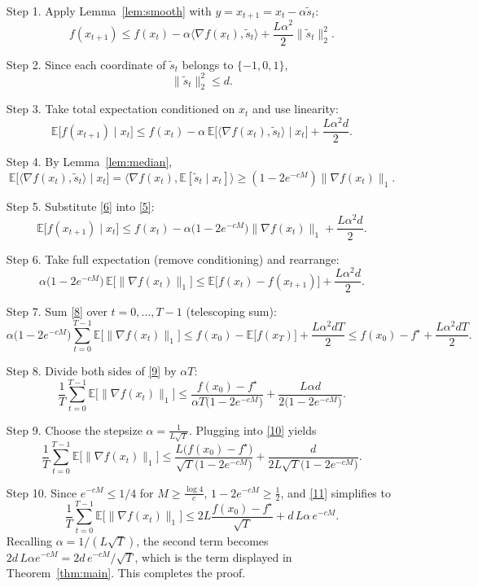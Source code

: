 \documentclass{article}
\newcommand{\E}{\mathbb{E}}
\begin{document}
\begin{enumerate}
\item[Step 1.] Apply Lemma~\ref{lem:smooth} with $y=x_{t+1}=x_{t}-\alpha\tilde{s}_{t}$:
\[
f(x_{t+1})\le f(x_{t})-\alpha\langle\nabla f(x_{t}),\tilde{s}_{t}\rangle
               +\frac{L\alpha^{2}}{2}\|\tilde{s}_{t}\|_{2}^{2}.
\tag{3}
\]
\item[Step 2.] Since each coordinate of $\tilde{s}_{t}$ belongs to $\{-1,0,1\}$,
\[
\|\tilde{s}_{t}\|_{2}^{2}\le d.
\tag{4}
\]
\item[Step 3.] Take total expectation conditioned on $x_{t}$ and use
linearity:
\[
\E\big[f(x_{t+1})\mid x_{t}\big]
   \le f(x_{t})-\alpha\,\E\!\big[\langle\nabla f(x_{t}),\tilde{s}_{t}\rangle\mid x_{t}\big]
        +\frac{L\alpha^{2}d}{2}.
\tag{5}
\]
\item[Step 4.] By Lemma~\ref{lem:median},
\[
\E\!\big[\langle\nabla f(x_{t}),\tilde{s}_{t}\rangle\mid x_{t}\big]
      =\langle\nabla f(x_{t}),\E[\tilde{s}_{t}\mid x_{t}]\rangle
      \ge (1-2e^{-cM})\|\nabla f(x_{t})\|_{1}.
\tag{6}
\]
\item[Step 5.] Substitute \eqref{6} into \eqref{5}:
\[
\E\big[f(x_{t+1})\mid x_{t}\big]
   \le f(x_{t})-\alpha\big(1-2e^{-cM}\big)\|\nabla f(x_{t})\|_{1}
        +\frac{L\alpha^{2}d}{2}.
\tag{7}
\]
\item[Step 6.] Take full expectation (remove conditioning) and rearrange:
\[
\alpha\big(1-2e^{-cM}\big)\,\E\!\big[\|\nabla f(x_{t})\|_{1}\big]
   \le \E\big[f(x_{t})-f(x_{t+1})\big]+\frac{L\alpha^{2}d}{2}.
\tag{8}
\]
\item[Step 7.] Sum \eqref{8} over $t=0,\dots,T-1$ (telescoping sum):
\[
\alpha\big(1-2e^{-cM}\big)\sum_{t=0}^{T-1}\E\!\big[\|\nabla f(x_{t})\|_{1}\big]
   \le f(x_{0})- \E\big[f(x_{T})\big] + \frac{L\alpha^{2}dT}{2}
   \le f(x_{0})-f^{\star} + \frac{L\alpha^{2}dT}{2}.
\tag{9}
\]
\item[Step 8.] Divide both sides of \eqref{9} by $\alpha T$:
\[
\frac{1}{T}\sum_{t=0}^{T-1}\E\!\big[\|\nabla f(x_{t})\|_{1}\big]
   \le \frac{f(x_{0})-f^{\star}}{\alpha T\big(1-2e^{-cM}\big)}
        +\frac{L\alpha d}{2\big(1-2e^{-cM}\big)}.
\tag{10}
\]
\item[Step 9.] Choose the stepsize $\alpha = \frac{1}{L\sqrt{T}}$.
Plugging into \eqref{10} yields
\[
\frac{1}{T}\sum_{t=0}^{T-1}\E\!\big[\|\nabla f(x_{t})\|_{1}\big]
   \le \frac{L\big(f(x_{0})-f^{\star}\big)}{\sqrt{T}\big(1-2e^{-cM}\big)}
        +\frac{d}{2L\sqrt{T}\big(1-2e^{-cM}\big)}.
\tag{11}
\]
\item[Step 10.] Since $e^{-cM}\le 1/4$ for $M\ge \frac{\log 4}{c}$,
$1-2e^{-cM}\ge \frac12$, and \eqref{11} simplifies to
\[
\frac{1}{T}\sum_{t=0}^{T-1}\E\!\big[\|\nabla f(x_{t})\|_{1}\big]
   \le 2L\frac{f(x_{0})-f^{\star}}{\sqrt{T}} + d\,L\alpha\,e^{-cM}.
\tag{12}
\]
Recalling $\alpha=1/(L\sqrt{T})$, the second term becomes
$2d\,L\alpha e^{-cM}=2d\,e^{-cM}/\sqrt{T}$, which is the term displayed in
Theorem~\ref{thm:main}.  This completes the proof.
\end{enumerate}
\end{document}
